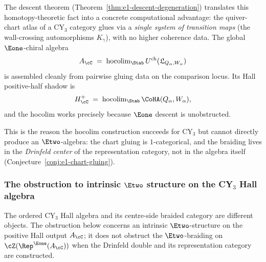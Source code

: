 The descent theorem (Theorem~\ref{thm:e1-descent-degeneration}) translates this homotopy-theoretic fact into a concrete computational advantage: the quiver-chart atlas of a CY$_3$ category glues via a \emph{single system of transition maps} (the wall-crossing automorphisms $K_\gamma$), with no higher coherence data. The global $\Eone$-chiral algebra
\[
 A_\cC \;=\; \operatorname{hocolim}_{\Stab} U^{\mathrm{ch}}(\mathfrak L_{Q_\alpha,W_\alpha})
\]
is assembled cleanly from pairwise gluing data on the comparison locus. Its Hall positive-half shadow is
\[
 H^+_\cC \;=\; \operatorname{hocolim}_{\Stab} \CoHA(Q_\alpha, W_\alpha),
\]
and the hocolim works precisely because $\Eone$ descent is unobstructed.

This is the reason the hocolim construction succeeds for CY$_3$ but cannot directly produce an $\Etwo$-algebra: the chart gluing is $1$-categorical, and the braiding lives in the \emph{Drinfeld center} of the representation category, not in the algebra itself (Conjecture~\ref{conj:e1-chart-gluing}).


\subsubsection{The obstruction to intrinsic \texorpdfstring{$\Etwo$}{E2} structure on the CY\texorpdfstring{$_3$}{3} Hall algebra}
\label{subsubsec:e1-e2-obstruction}

The ordered CY$_3$ Hall algebra and its centre-side braided category are
different objects. The obstruction below concerns an intrinsic
\(\Etwo\)-structure on the positive Hall output \(A_\cC\); it does not
obstruct the \(\Etwo\)-braiding on
\(\cZ(\Rep^{\Eone}(A_\cC))\) when the Drinfeld double and its
representation category are constructed.


